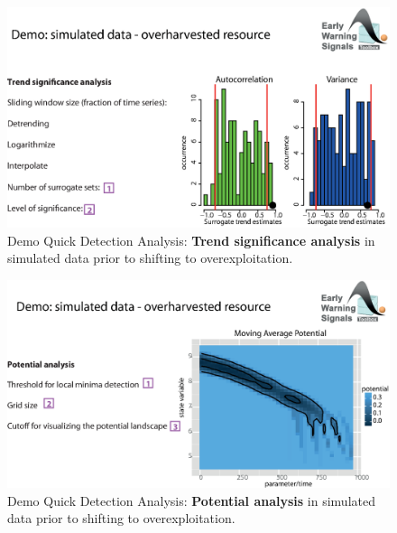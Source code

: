 \documentclass[12pt,a4paper,final]{article}
\begin{document}
\newpage
\begin{figure}[ht]
\begin{center}
\includegraphics[scale=0.8]{fig_4_simulated_significance.eps}
\caption{Demo Quick Detection Analysis: \textbf{Trend significance analysis} in simulated data prior to shifting to overexploitation.}
\end{center}
\label{fig:simulated_significance}
\end{figure} 

\newpage
\begin{figure}[ht]
\begin{center}
\includegraphics[scale=0.8]{fig_5_simulated_potential.eps}
\caption{Demo Quick Detection Analysis: \textbf{Potential analysis} in simulated data prior to shifting to overexploitation.}
\end{center}
\label{fig:simulated_potential}
\end{figure} 
\end{document}
